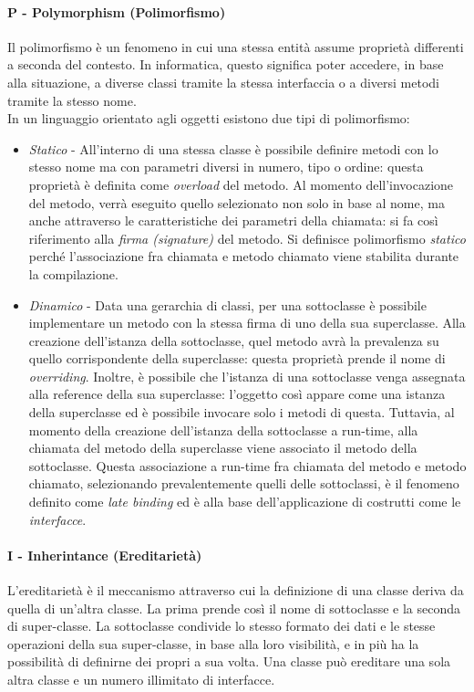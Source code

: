 \documentclass{article}
\begin{document}
        \paragraph{P - Polymorphism (Polimorfismo)} Il polimorfismo è un fenomeno in cui una stessa entità assume proprietà differenti a seconda del contesto. In informatica, questo significa poter accedere, in base alla situazione, a diverse classi tramite la stessa interfaccia o a diversi metodi tramite la stesso nome.\\
            In un linguaggio orientato agli oggetti esistono due tipi di polimorfismo:
            \begin{itemize}
                \item \textit{Statico} - All'interno di una stessa classe è possibile definire metodi con lo stesso nome ma con parametri diversi in numero, tipo o ordine: questa proprietà è definita come \textit{overload} del metodo. Al momento dell'invocazione del metodo, verrà eseguito quello selezionato non solo in base al nome, ma anche attraverso le caratteristiche dei parametri della chiamata: si fa così riferimento alla \textit{firma (signature)} del metodo. Si definisce polimorfismo \textit{statico} perché l'associazione fra chiamata e metodo chiamato viene stabilita durante la compilazione.
                \item \textit{Dinamico} - Data una gerarchia di classi, per una sottoclasse è possibile implementare un metodo con la stessa firma di uno della sua superclasse. Alla creazione dell'istanza della sottoclasse, quel metodo avrà la prevalenza su quello corrispondente della superclasse: questa proprietà prende il nome di \textit{overriding}. Inoltre, è possibile che l'istanza di una sottoclasse venga assegnata alla reference della sua superclasse: l'oggetto così appare come una istanza della superclasse ed è possibile invocare solo i metodi di questa. Tuttavia, al momento della creazione dell'istanza della sottoclasse a run-time, alla chiamata del metodo della superclasse viene associato il metodo della sottoclasse. Questa associazione a run-time fra chiamata del metodo e metodo chiamato, selezionando prevalentemente quelli delle sottoclassi, è il fenomeno definito come \textit{late binding} ed è alla base dell'applicazione di costrutti come le \textit{interfacce}.
            \end{itemize}
        
        \paragraph{I - Inherintance (Ereditarietà)} L'ereditarietà è il meccanismo attraverso cui la definizione di una classe deriva da quella di un'altra classe. La prima prende così il nome di sottoclasse e la seconda di super-classe. La sottoclasse condivide lo stesso formato dei dati e le stesse operazioni della sua super-classe, in base alla loro visibilità, e in più ha la possibilità di definirne dei propri a sua volta. Una classe può ereditare una sola altra classe e un numero illimitato di interfacce.
        
\end{document}
